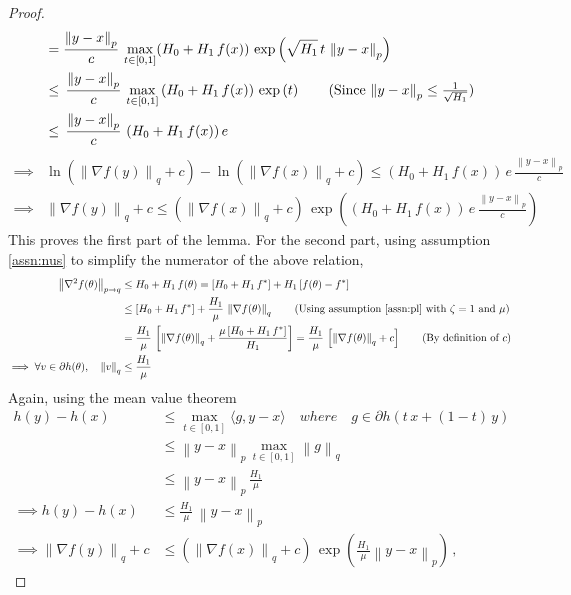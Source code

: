 \documentclass{article}
\newcommand{\norm}[1]{\left\|#1 \right\|}
\begin{document}
\begin{proof}
\begin{align*}
& = \frac{\norm{y - x}_p}{c} \,\max_{t\in[0,1]}  (H_0 + H_1 \, f(x)) \,  \exp\left(\sqrt{H_1} \, t \, \norm{y - x}_p \right) \\
& \leq\, \frac{\norm{y - x}_p}{c} \, \max_{t\in[0,1]} \, (H_0 + H_1 \, f(x)) \,  \exp\left(t \right)  \tag{Since $\norm{y  - x}_p \leq \frac{1}{\sqrt{H_1}}$} \\
& \leq\, \frac{\norm{y - x}_p}{c} \,  \, (H_0 + H_1 \, f(x)) \,e  
\end{align*}
\begin{align*}
\implies & \ln(\norm{\nabla f(y)}_q  + c) - \ln(\norm{\nabla f(x)}_q  + c)  \leq  (H_0 + H_1 \, f(x)) \, e \, \frac{\norm{y - x}_p}{c} \\
\implies & \norm{\nabla f(y)}_q  + c \leq \left(\norm{\nabla f(x)}_q  + c \right) \, \exp\left((H_0 + H_1 \, f(x)) \, e \, \frac{\norm{y - x}_p}{c} \right) 
\end{align*}
This proves the first part of the lemma. For the second part, using assumption \ref{assn:nus} to simplify the numerator of the above relation, 
\begin{align*}
\norm{\nabla^2 f(\theta)}_{p \to q} & \leq H_0 + H_1 \, f(\theta) = [H_0 + H_1 \, f^*] + H_1 \, [f(\theta) - f^*] \\
& \leq  [H_0 + H_1 \, f^*] + \frac{H_1}{\mu} \, \norm{\nabla f(\theta)}_{q} \tag{Using assumption \ref{assn:pl} with $\zeta = 1$ and $\mu$} \\
& = \frac{H_1}{\mu} \, \left[ \norm{\nabla f(\theta)}_{q} + \frac{\mu \, [H_0 + H_1 \, f^*]}{H_1} \right] = \frac{H_1}{\mu} \, \left[\norm{\nabla f(\theta)}_{q} + c \right] \tag{By definition of $c$} \\
\implies \forall v \in \partial{h}(\theta), \quad \norm{v}_q & \leq \frac{H_1}{\mu}
\end{align*}
Again, using the mean value theorem
\begin{align*}
h(y) - h(x) &\leq \max_{t\in[0,1]}  \langle g, y - x \rangle  \quad {where} \quad g \in \partial h(t \, x + (1-t) \, y) \\
& \leq \norm{y - x}_p \, \max_{t\in[0,1]} \norm{g}_q  \tag{Using Holder's inequality} \\
& \leq \norm{y - x}_p \,   \frac{H_1}{\mu}  \tag{Using the above bound on the subgradient} \\
\implies h(y) - h(x) & \leq \frac{H_1}{\mu} \, \norm{y - x}_p \\
\implies \norm{\nabla f(y)}_q + c & \leq \left(\norm{\nabla f(x)}_q + c \right) \,  \exp \left(\frac{H_1}{\mu} \norm{y - x}_{p} \right) \,,
\end{align*}
\end{proof}
\end{document}
